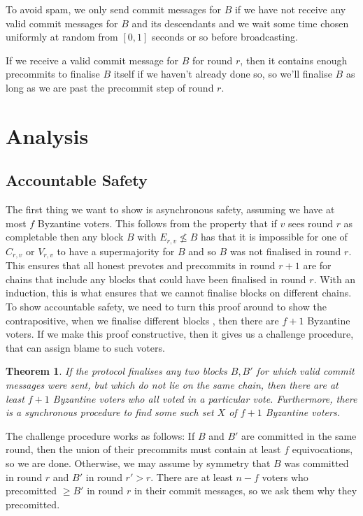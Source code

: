 \documentclass{article}
\newtheorem{theorem}{Theorem}[section]
\begin{document}
To avoid spam, we only send commit messages for $B$ if we have not receive any valid commit messages for $B$ and its descendants and we wait some time chosen uniformly at random from $[0,1]$ seconds or so before broadcasting.

If we receive a valid commit message for $B$ for round $r$, then it contains enough precommits to finalise $B$ itself if we haven't already done so, so we'll finalise $B$ as long as we are past the precommit step of round $r$.

\section{ Analysis }

\subsection{ Accountable Safety}

The first thing we want to show is asynchronous safety, assuming we have at most $f$ Byzantine voters. This follows from the property that if $v$ sees round $r$ as completable then any block $B$ with $E_{r,v} \not\leq B$ has that it is impossible for one of $C_{r,v}$ or $V_{r,v}$ to have a supermajority for $B$ and so $B$ was not finalised in round $r$. This ensures that all honest prevotes and precommits in round $r+1$ are for chains that include any blocks that could have been finalised in round $r$. With an induction, this is what ensures that we cannot finalise blocks on different chains. To show accountable safety, we need to turn this proof around to show the contrapositive, when we finalise different blocks , then there are $f+1$ Byzantine voters. If we make this proof constructive, then it gives us a challenge procedure, that can assign blame to such voters.

\begin{theorem} \label{thm:accountable} If the protocol finalises any two blocks $B,B'$ for which valid commit messages were sent, but which do not lie on the same chain, then there are at least $f+1$ Byzantine voters who all voted in a particular vote. Furthermore, there is a synchronous procedure to find some such set $X$ of $f+1$ Byzantine voters.
\end{theorem}

The challenge procedure works as follows: If $B$ and $B'$ are committed in the same round, then the union of their precommits must contain at least $f$ equivocations, so we are done.  Otherwise, we may assume by symmetry that $B$ was committed in round $r$ and $B'$ in round $r' > r$.  There are at least $n-f$ voters who precomitted $\geq B'$ in round $r$ in their commit messages, so we ask them why they precomitted.
\end{document}
